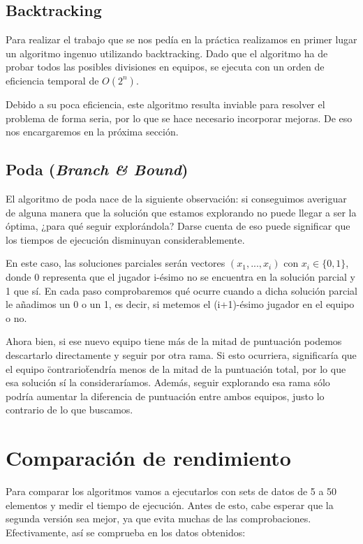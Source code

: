 \documentclass[a4paper, 11pt]{article}
\begin{document}
\subsection{Backtracking}
Para realizar el trabajo que se nos pedía en la práctica realizamos en primer lugar un algoritmo ingenuo utilizando backtracking. Dado que el algoritmo ha de probar todos las posibles divisiones en equipos, se ejecuta con un orden de eficiencia temporal de $O(2^n)$. 

Debido a su poca eficiencia, este algoritmo resulta inviable para resolver el problema de forma seria, por lo que se hace necesario incorporar mejoras. De eso nos encargaremos en la próxima sección.

\subsection{Poda (\protect\textit{Branch \& Bound})}
El algoritmo de poda nace de la siguiente observación: si conseguimos averiguar de alguna manera que la solución que estamos explorando no puede llegar a ser la óptima, ¿para qué seguir explorándola? Darse cuenta de eso puede significar que los tiempos de ejecución disminuyan considerablemente.

En este caso, las soluciones parciales serán vectores $(x_1, ..., x_i)$ con
$x_i \in \{0, 1\}$, donde 0 representa que el jugador i-ésimo no se encuentra en la solución parcial
y 1 que sí. En cada paso comprobaremos qué ocurre cuando a dicha solución parcial le añadimos un 0
o un 1, es decir, si metemos el (i+1)-ésimo jugador en el equipo o no. 

Ahora bien, si ese nuevo equipo tiene más de la mitad de puntuación podemos descartarlo directamente
y seguir por otra rama. Si esto ocurriera, significaría que el equipo \"contrario\" tendría menos de la 
mitad de la puntuación total, por lo que esa solución sí la consideraríamos. Además, seguir explorando esa 
rama sólo podría aumentar la diferencia de puntuación entre ambos equipos, justo lo contrario de lo
que buscamos.

\section{Comparación de rendimiento}

Para comparar los algoritmos vamos a ejecutarlos con sets de datos de 5 a 50 elementos
y medir el tiempo de ejecución. Antes de esto, cabe esperar que la segunda versión sea
mejor, ya que evita muchas de las comprobaciones. Efectivamente, así se comprueba en los 
datos obtenidos:
\end{document}
